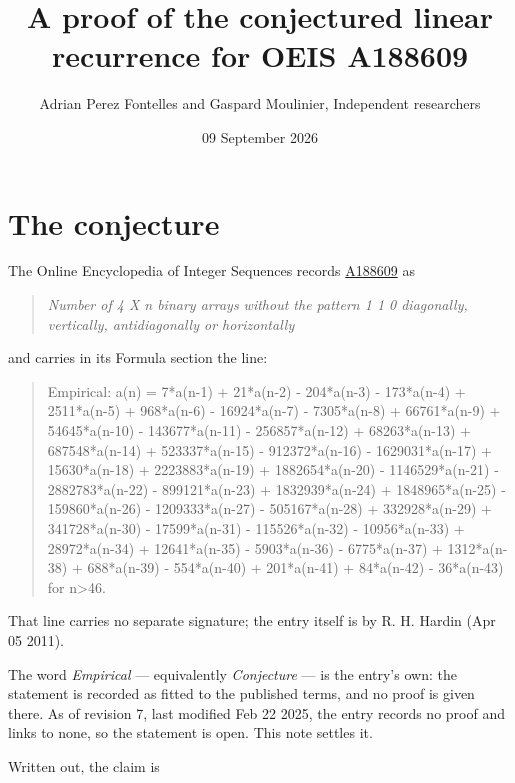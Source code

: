 \documentclass[11pt]{article}
\title{A proof of the conjectured linear recurrence for OEIS A188609}
\author{Adrian Perez Fontelles and Gaspard Moulinier, Independent researchers}
\date{09 September 2026}
\theoremstyle{definition}
\begin{document}
\maketitle
\section{The conjecture}

The Online Encyclopedia of Integer Sequences records \href{https://oeis.org/A188609}{A188609} as

\begin{quote}\itshape Number of 4 X n binary arrays without the pattern 1 1 0 diagonally, vertically, antidiagonally or horizontally\end{quote}

and carries in its Formula section the line:

\begin{quote}\ttfamily Empirical: a(n) = 7*a(n-1) + 21*a(n-2) - 204*a(n-3) - 173*a(n-4) + 2511*a(n-5) + 968*a(n-6) - 16924*a(n-7) - 7305*a(n-8) + 66761*a(n-9) + 54645*a(n-10) - 143677*a(n-11) - 256857*a(n-12) + 68263*a(n-13) + 687548*a(n-14) + 523337*a(n-15) - 912372*a(n-16) - 1629031*a(n-17) + 15630*a(n-18) + 2223883*a(n-19) + 1882654*a(n-20) - 1146529*a(n-21) - 2882783*a(n-22) - 899121*a(n-23) + 1832939*a(n-24) + 1848965*a(n-25) - 159860*a(n-26) - 1209333*a(n-27) - 505167*a(n-28) + 332928*a(n-29) + 341728*a(n-30) - 17599*a(n-31) - 115526*a(n-32) - 10956*a(n-33) + 28972*a(n-34) + 12641*a(n-35) - 5903*a(n-36) - 6775*a(n-37) + 1312*a(n-38) + 688*a(n-39) - 554*a(n-40) + 201*a(n-41) + 84*a(n-42) - 36*a(n-43) for n>46.\end{quote}

That line carries no separate signature; the entry itself is by R. H. Hardin (Apr 05 2011).

The word {\itshape Empirical} --- equivalently {\itshape Conjecture} --- is the entry's own: the statement is recorded as fitted to the published terms, and no proof is given there. As of revision 7, last modified Feb 22 2025, the entry records no proof and links to none, so the statement is open. This note settles it.

Written out, the claim is
\end{document}
